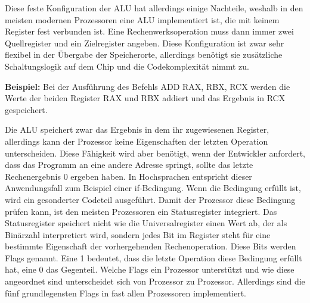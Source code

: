 \documentclass[a4paper,12pt]{article}
\begin{document}
\noindent Diese feste Konfiguration der ALU hat allerdings einige Nachteile, weshalb in den meisten modernen Prozessoren eine ALU implementiert ist, die mit keinem Register fest verbunden ist. Eine Rechenwerksoperation muss dann immer zwei Quellregister und ein Zielregister angeben. Diese Konfiguration ist zwar sehr flexibel in der Übergabe der Speicherorte, allerdings benötigt sie zusätzliche Schaltungslogik auf dem Chip und die Codekomplexität nimmt zu.

\par\bigskip
\noindent \textbf{Beispiel:} Bei der Ausführung des Befehls ADD RAX, RBX, RCX werden die Werte der beiden Register RAX und RBX addiert und das Ergebnis in RCX gespeichert.

\par\smallskip\noindent Die ALU speichert zwar das Ergebnis in dem ihr zugewiesenen Register, allerdings kann der Prozessor keine Eigenschaften der letzten Operation unterscheiden. Diese Fähigkeit wird aber benötigt, wenn der Entwickler anfordert, dass das Programm an eine andere Adresse springt, sollte das letzte Rechenergebnis 0 ergeben haben. In Hochsprachen entspricht dieser Anwendungsfall zum Beispiel einer if-Bedingung. Wenn die Bedingung erfüllt ist, wird ein gesonderter Codeteil ausgeführt. Damit der Prozessor diese Bedingung prüfen kann, ist den meisten Prozessoren ein Statusregister integriert. Das Statusregister speichert nicht wie die Universalregister einen Wert ab, der als Binärzahl interpretiert wird, sondern jedes Bit im Register steht für eine bestimmte Eigenschaft der vorhergehenden Rechenoperation. Diese Bits werden Flags genannt. Eine 1 bedeutet, dass die letzte Operation diese Bedingung erfüllt hat, eine 0 das Gegenteil. Welche Flags ein Prozessor unterstützt und wie diese angeordnet sind unterscheidet sich von Prozessor zu Prozessor. Allerdings sind die fünf grundlegensten Flags in fast allen Prozessoren implementiert.
\end{document}
